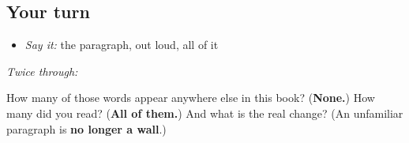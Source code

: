 \subsection*{Your turn}
\begin{itemize}
\raggedright
  \item \emph{Say it:} the paragraph, out loud, all of it
\end{itemize}

\emph{Twice through:}

\begin{tcolorbox}[breakable,colback=teal!4,colframe=teal!35!black,title={Before you move on}]
How many of those words appear anywhere else in this book? (\textbf{None.}) How many did you read? (\textbf{All of them.}) And what is the real change? (An unfamiliar paragraph is \textbf{no longer a wall}.)
\end{tcolorbox}
